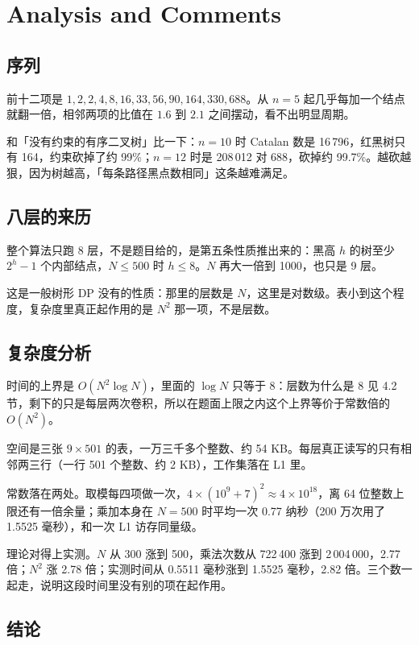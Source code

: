 \documentclass[12pt,a4paper,fontset=windows]{ctexart}
\begin{document}
\section{Analysis and Comments}

\subsection{序列}

前十二项是 $1,2,2,4,8,16,33,56,90,164,330,688$。从 $n=5$ 起几乎每加一个结点就翻一倍，相邻两项的比值在 $1.6$ 到 $2.1$ 之间摆动，看不出明显周期。

和「没有约束的有序二叉树」比一下：$n=10$ 时 Catalan 数是 16\,796，红黑树只有 164，约束砍掉了约 99\%；$n=12$ 时是 208\,012 对 688，砍掉约 99.7\%。越砍越狠，因为树越高，「每条路径黑点数相同」这条越难满足。

\subsection{八层的来历}

整个算法只跑 8 层，不是题目给的，是第五条性质推出来的：黑高 $h$ 的树至少 $2^h-1$ 个内部结点，$N\le 500$ 时 $h\le 8$。$N$ 再大一倍到 1000，也只是 9 层。

这是一般树形 DP 没有的性质：那里的层数是 $N$，这里是对数级。表小到这个程度，复杂度里真正起作用的是 $N^2$ 那一项，不是层数。

\subsection{复杂度分析}

时间的上界是 $O(N^2\log N)$，里面的 $\log N$ 只等于 8：层数为什么是 8 见 4.2 节，剩下的只是每层两次卷积，所以在题面上限之内这个上界等价于常数倍的 $O(N^2)$。

空间是三张 $9\times 501$ 的表，一万三千多个整数、约 54 KB。每层真正读写的只有相邻两三行（一行 501 个整数、约 2 KB），工作集落在 L1 里。

常数落在两处。取模每四项做一次，$4\times(10^9+7)^2\approx4\times10^{18}$，离 64 位整数上限还有一倍余量；乘加本身在 $N=500$ 时平均一次 0.77 纳秒（200 万次用了 1.5525 毫秒），和一次 L1 访存同量级。

理论对得上实测。$N$ 从 300 涨到 500，乘法次数从 722\,400 涨到 2\,004\,000，2.77 倍；$N^2$ 涨 2.78 倍；实测时间从 0.5511 毫秒涨到 1.5525 毫秒，2.82 倍。三个数一起走，说明这段时间里没有别的项在起作用。

\subsection{结论}
\end{document}
